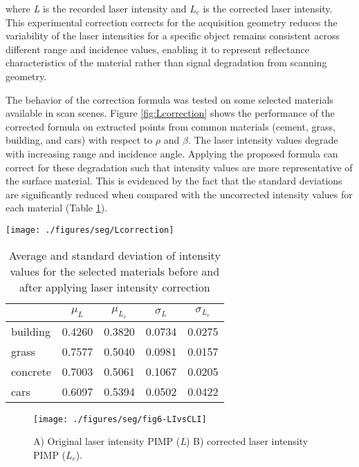 \documentclass[final,3p,times,twocolumn,authoryear]{elsarticle}
\begin{document}
\noindent where \textit{L} is the recorded laser intensity and $L_c$ is the corrected laser intensity. This experimental correction corrects for the acquisition geometry reduces the variability of the laser intensities for a specific object remains consistent across different range and incidence values, enabling it to represent reflectance characteristics of the material rather than signal degradation from scanning geometry.

The behavior of the correction formula was tested on some selected materials available in scan scenes. Figure \ref{fig:Lcorrection} shows the performance of the corrected formula on extracted points from common materials (cement, grass, building, and cars) with respect to $\rho$ and $\beta$. 
The laser intensity values degrade with increasing range and incidence angle. Applying the proposed formula can correct for these degradation such that intensity values are more representative of the surface material. This is evidenced by the fact that the standard deviations are significantly reduced when compared with the uncorrected intensity values for each material (Table \ref{tab:Lcor}).   

\begin{figure*}[t]
	\centering
	\texttt{[image: ./figures/seg/Lcorrection]}
	\caption{The performance of the laser intensity correction formula on laser intensity values of different materials A) building, B) grass, C) concrete, D) cars}
	\label{fig:Lcorrection}
\end{figure*}

\begin{table}[h]
	\centering
	\caption{Average and standard deviation of intensity values for the selected materials before and after applying laser intensity correction}
	\label{tab:Lcor}
	\begin{tabular}{l|cccc}
		& $\mu_L$ & $\mu_{L_c}$ & $\sigma_L$ & $\sigma_{L_c}$ \\
		\hline
		building & 0.4260  & 0.3820        & 0.0734    & 0.0275          \\
		grass    & 0.7577 & 0.5040        & 0.0981    & 0.0157          \\
		concrete   & 0.7003 & 0.5061       & 0.1067    & 0.0205          \\
		cars     & 0.6097 & 0.5394       & 0.0502    & 0.0422         
	\end{tabular}
\end{table}

\begin{figure}[h]
	\centering
	\texttt{[image: ./figures/seg/fig6-LIvsCLI]}
	\caption{A) Original laser intensity PIMP (\textit{L}) B) corrected laser intensity PIMP ($L_c$).}
	\label{fig:fig6-LIvsCLI}
\end{figure}
\end{document}
